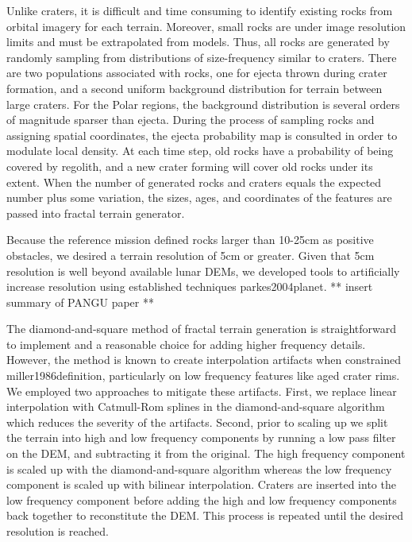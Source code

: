 \documentclass[twocolumn,letterpaper]{IEEEAerospaceCLS}  %
\begin{document}
Unlike craters, it is difficult and time consuming to identify existing rocks from orbital imagery for each terrain. Moreover, small rocks are under image resolution limits and must be extrapolated from models. Thus, all rocks are generated by randomly sampling from distributions of size-frequency similar to craters. There are two populations associated with rocks, one for ejecta thrown during crater formation, and a second uniform background distribution for terrain between large craters. For the Polar regions, the background distribution is several orders of magnitude sparser than ejecta. During the process of sampling rocks and assigning spatial coordinates, the ejecta probability map is consulted in order to modulate local density. At each time step, old rocks have a probability of being covered by regolith, and a new crater forming will cover old rocks under its extent. When the number of generated rocks and craters equals the expected number plus some variation, the sizes, ages, and coordinates of the features are passed into fractal terrain generator.     

Because the reference mission defined rocks larger than 10-25cm as positive obstacles, we desired a terrain resolution of 5cm or greater. Given that 5cm resolution is well beyond available lunar DEMs, we developed tools to artificially increase resolution using established techniques {parkes2004planet}. ** insert summary of PANGU paper **

The diamond-and-square method of fractal terrain generation is straightforward to implement and a reasonable choice for adding higher frequency details. However, the method is known to create interpolation artifacts when constrained {miller1986definition}, particularly on low frequency features like aged crater rims. We employed two approaches to mitigate these artifacts. First, we replace linear interpolation with Catmull-Rom splines in the diamond-and-square algorithm which reduces the severity of the artifacts. Second, prior to scaling up we split the terrain into high and low frequency components by running a low pass filter on the DEM, and subtracting it from the original. The high frequency component is scaled up with the diamond-and-square algorithm whereas the low frequency component is scaled up with bilinear interpolation. Craters are inserted into the low frequency component before adding the high and low frequency components back together to reconstitute the DEM. This process is repeated until the desired resolution is reached. 
\end{document}
